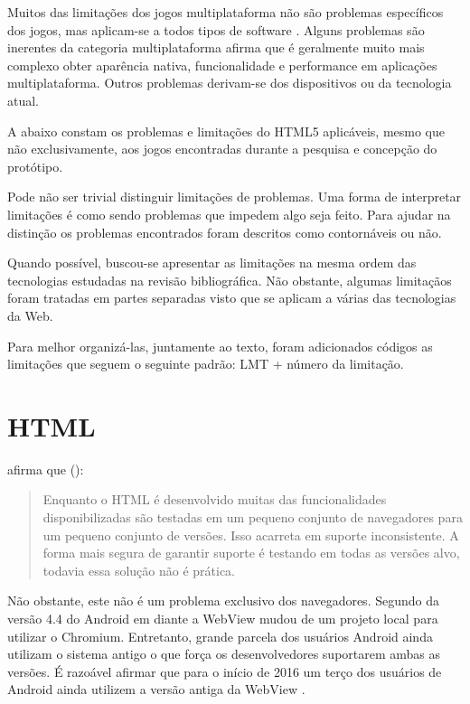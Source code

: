 
Muitos das limitações dos jogos multiplataforma não são
problemas específicos dos jogos, mas aplicam-se a todos tipos
de software \autocite[p. 3]{currentStateCrossPlatform}. Alguns
problemas são inerentes da categoria multiplataforma \cite[p.
7 ]{viabilityBusinessApplications} afirma que é geralmente muito
mais complexo obter aparência nativa, funcionalidade e performance
em aplicações multiplataforma. Outros problemas derivam-se dos
dispositivos ou da tecnologia atual.

A abaixo constam os problemas e limitações do HTML5 aplicáveis, mesmo que não
exclusivamente, aos jogos encontradas durante a pesquisa e concepção
do protótipo.

Pode não ser trivial distinguir limitações de
problemas. Uma forma de interpretar limitações é como sendo problemas
que impedem algo seja feito. Para ajudar na distinção os
problemas encontrados foram descritos como contornáveis ou não.

Quando possível, buscou-se apresentar as limitações na
mesma ordem das tecnologias estudadas na revisão bibliográfica. Não
obstante, algumas limitaçãos foram tratadas em partes
separadas visto que se aplicam a várias das tecnologias da Web.

Para melhor organizá-las, juntamente ao texto, foram adicionados
códigos as limitações que seguem o seguinte padrão: LMT + número da
limitação.

\section{HTML}

\citet{crossPlatformMobileGame} afirma que ():
\begin{quote}
Enquanto o HTML é desenvolvido muitas das funcionalidades
disponibilizadas são testadas em um pequeno conjunto de navegadores
para um pequeno conjunto de versões. Isso acarreta em suporte
inconsistente. A forma mais segura de garantir suporte é testando em
todas as versões alvo, todavia essa solução não é prática.
\end{quote}

Não obstante, este não é um problema exclusivo dos navegadores.  
Segundo \citet{chromeWebView} da versão 4.4 do Android em diante a
WebView mudou de um projeto local para utilizar o Chromium. Entretanto,
grande parcela dos usuários Android ainda utilizam o sistema antigo o
que força os desenvolvedores suportarem ambas as versões. É razoável
afirmar que para o início de 2016 um terço dos usuários de Android
ainda utilizem a versão antiga da WebView \citet{chromeWebView}.

